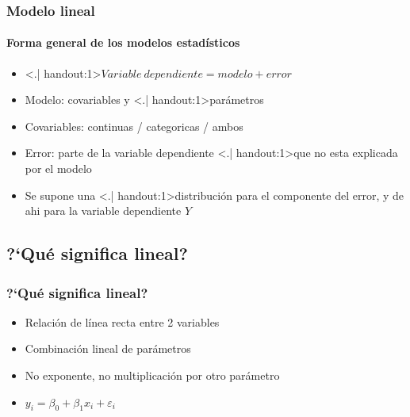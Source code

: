 \documentclass[gray,handout,mathserif]{beamer}
\begin{document}
 
\begin{frame}[label=linmodel2]
   \frametitle{Modelo lineal}
   \framesubtitle{Forma general de los modelos estad\'isticos}
    \begin{itemize}[<+- | visible@+-| handout:1>]
      \item \alert<.| handout:1>{$Variable~dependiente = modelo + error$}
      \medskip
      \item Modelo: covariables y \structure<.| handout:1>{par\'ametros}
      \item Covariables: continuas / categoricas / ambos
      \item Error: parte de la variable dependiente \structure<.| handout:1>{que no esta explicada} por el modelo
      \medskip
      \item Se supone una \structure<.| handout:1>{distribuci\'on} para el componente del error, y de ahi para la variable dependiente $Y$
   \end{itemize}
\end{frame}%


\subsection[?`Lineal?]{?`Qu\'e significa lineal?}
  
\begin{frame}[label=signilineal]
   \frametitle{?`Qu\'e significa lineal?}
    \begin{itemize}[<+-| visible@+-| handout:1>]
      \item Relaci\'on de l\'inea recta entre 2 variables
      \item Combinaci\'on lineal de par\'ametros 
      \item No exponente, no multiplicaci\'on por otro par\'ametro
      \item $y_i=\beta_0+\beta_1 x_i+\varepsilon_i$
   \end{itemize}
\end{frame}%
\end{document}
